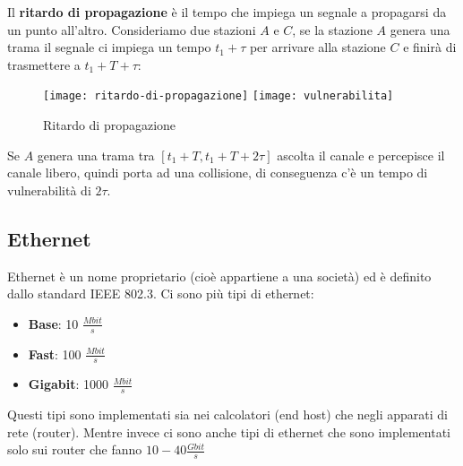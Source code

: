 \documentclass[a4paper]{article}
\begin{document}
\vspace{1em}
\noindent
Il \textbf{ritardo di propagazione} è il tempo che impiega un segnale a propagarsi
da un punto all'altro. Consideriamo due stazioni \( A \) e \( C \), se la stazione
\( A \) genera una trama il segnale ci impiega un tempo \( t_1 + \tau \) per arrivare
alla stazione \( C \) e finirà di trasmettere a \( t_1 + T + \tau \):
\begin{figure}[H]
  \centering
  \texttt{[image: ritardo-di-propagazione]}
  \texttt{[image: vulnerabilita]}
  \caption{Ritardo di propagazione}
\end{figure}
\noindent
Se \( A \) genera una trama tra \( [t_1+T,t_1+T+2\tau] \) ascolta il canale e percepisce
il canale libero, quindi porta ad una collisione, di conseguenza c'è un tempo di 
vulnerabilità di \( 2\tau \).

\subsection{Ethernet}
Ethernet è un nome proprietario (cioè appartiene a una società) ed è definito dallo
standard IEEE 802.3. Ci sono più tipi di ethernet:
\begin{itemize}
  \item \textbf{Base}: 10 \( \frac{Mbit}{s} \) 
  \item \textbf{Fast}: 100 \( \frac{Mbit}{s} \)
  \item \textbf{Gigabit}: 1000 \( \frac{Mbit}{s} \)
\end{itemize}
Questi tipi sono implementati sia nei calcolatori (end host) che negli apparati
di rete (router). Mentre invece ci sono anche tipi di ethernet che sono implementati
solo sui router che fanno \( 10-40 \frac{Gbit}{s} \) 
\end{document}
